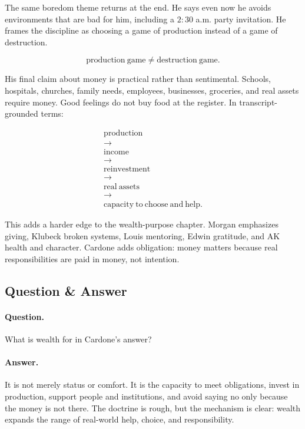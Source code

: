 \documentclass[11pt,oneside]{book}
\begin{document}
The same boredom theme returns at the end. He says even now he avoids environments that are bad for him, including a \(2{:}30\) a.m. party invitation. He frames the discipline as choosing a game of production instead of a game of destruction.

\begin{equation}
\mathrm{production\ game}
\neq
\mathrm{destruction\ game}.
\end{equation}

His final claim about money is practical rather than sentimental. Schools, hospitals, churches, family needs, employees, businesses, groceries, and real assets require money. Good feelings do not buy food at the register. In transcript-grounded terms:

\begin{equation}
\begin{gathered}
\mathrm{production}\\
\longrightarrow\\
\mathrm{income}\\
\longrightarrow\\
\mathrm{reinvestment}\\
\longrightarrow\\
\mathrm{real\ assets}\\
\longrightarrow\\
\mathrm{capacity\ to\ choose\ and\ help}.
\end{gathered}
\end{equation}

This adds a harder edge to the wealth-purpose chapter. Morgan emphasizes giving, Klubeck broken systems, Louis mentoring, Edwin gratitude, and AK health and character. Cardone adds obligation: money matters because real responsibilities are paid in money, not intention.

\subsection{Question \& Answer}

\paragraph{Question.}
What is wealth for in Cardone's answer?

\paragraph{Answer.}
It is not merely status or comfort. It is the capacity to meet obligations, invest in production, support people and institutions, and avoid saying no only because the money is not there. The doctrine is rough, but the mechanism is clear: wealth expands the range of real-world help, choice, and responsibility.
\end{document}
